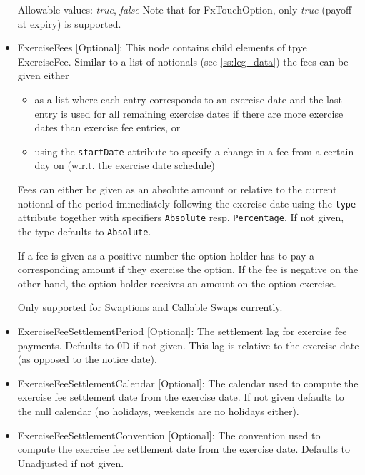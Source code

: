 \begin{itemize}
Allowable values: \emph{true}, \emph{false} Note that for FxTouchOption, only \emph{true} (payoff at expiry) is supported.

\item ExerciseFees [Optional]: This node contains child elements of tpye ExerciseFee. Similar to a list of notionals
  (see \ref{ss:leg_data}) the fees can be given either

  \begin{itemize}
  \item as a list where each entry corresponds to an exercise date and the last entry is used for all remaining exercise
    dates if there are more exercise dates than exercise fee entries, or
  \item using the \verb+startDate+ attribute to specify a change in a fee from a certain day on (w.r.t. the exercise
    date schedule)
  \end{itemize}

  Fees can either be given as an absolute amount or relative to the current notional of the period immediately following
  the exercise date using the \verb+type+ attribute together with specifiers \verb+Absolute+ resp. \verb+Percentage+. If
  not given, the type defaults to \verb+Absolute+.

  If a fee is given as a positive number the option holder has to pay a corresponding amount if they exercise the
  option. If the fee is negative on the other hand, the option holder receives an amount on the option exercise.

  Only supported for Swaptions and Callable Swaps currently.

\item ExerciseFeeSettlementPeriod [Optional]: The settlement lag for exercise fee payments. Defaults to 0D if not
  given. This lag is relative to the exercise date (as opposed to the notice date).

\item ExerciseFeeSettlementCalendar [Optional]: The calendar used to compute the exercise fee settlement date from the
  exercise date. If not given defaults to the null calendar (no holidays, weekends are no holidays either).

\item ExerciseFeeSettlementConvention [Optional]: The convention used to compute the exercise fee settlement date from
  the exercise date. Defaults to Unadjusted if not given.


\end{itemize}
